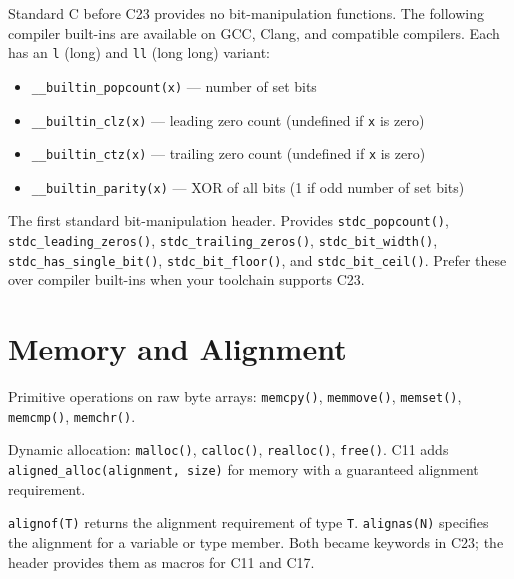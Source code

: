 \begin{description}[leftmargin=0pt, itemsep=10pt]

\item[GCC and Clang built-ins]
Standard C before C23 provides no bit-manipulation functions. The
following compiler built-ins are available on GCC, Clang, and compatible
compilers. Each has an \texttt{l} (long) and \texttt{ll} (long long)
variant:
\begin{itemize}[noitemsep]
  \item \texttt{\_\_builtin\_popcount(x)} --- number of set bits
  \item \texttt{\_\_builtin\_clz(x)} --- leading zero count (undefined if \texttt{x} is zero)
  \item \texttt{\_\_builtin\_ctz(x)} --- trailing zero count (undefined if \texttt{x} is zero)
  \item \texttt{\_\_builtin\_parity(x)} --- XOR of all bits (1 if odd number of set bits)
\end{itemize}

\item[\texttt{<stdbit.h>} \textnormal{(C23)}]
The first standard bit-manipulation header.
Provides \texttt{stdc\_popcount()}, \texttt{stdc\_leading\_zeros()},
\texttt{stdc\_trailing\_zeros()}, \texttt{stdc\_bit\_width()},
\texttt{stdc\_has\_single\_bit()}, \texttt{stdc\_bit\_floor()},
and \texttt{stdc\_bit\_ceil()}. Prefer these over compiler built-ins
when your toolchain supports C23.

\end{description}

\section{Memory and Alignment}

\begin{description}[leftmargin=0pt, itemsep=10pt]

\item[\texttt{<string.h>}]
Primitive operations on raw byte arrays: \texttt{memcpy()},
\texttt{memmove()}, \texttt{memset()}, \texttt{memcmp()}, \texttt{memchr()}.

\item[\texttt{<stdlib.h>}]
Dynamic allocation: \texttt{malloc()}, \texttt{calloc()},
\texttt{realloc()}, \texttt{free()}.
C11 adds \texttt{aligned\_alloc(alignment, size)} for memory with a
guaranteed alignment requirement.

\item[\texttt{<stdalign.h>} \textnormal{(C11)}]
\texttt{alignof(T)} returns the alignment requirement of type \texttt{T}.
\texttt{alignas(N)} specifies the alignment for a variable or type member.
Both became keywords in C23; the header provides them as macros for C11
and C17.

\end{description}

